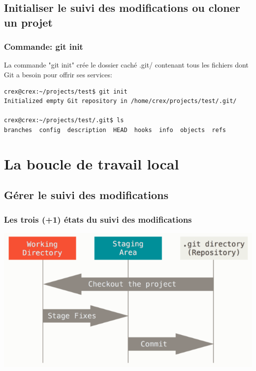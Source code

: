 \documentclass{beamer}
\begin{document}
\subsection{Initialiser le suivi des modifications ou cloner un projet}
\begin{frame}[fragile]
\frametitle{Commande: git init}
La commande "git init" crée le dossier caché .git/ contenant tous les fichiers dont Git a besoin pour offrir ses services:

    \begin{mdframed}[style=Bash]
    \begin{lstlisting}[style=Bash, caption={Contenu du dossier .git/}]
crex@crex:~/projects/test$ git init
Initialized empty Git repository in /home/crex/projects/test/.git/

crex@crex:~/projects/test/.git$ ls
branches  config  description  HEAD  hooks  info  objects  refs
    \end{lstlisting}
    \end{mdframed}
\end{frame}



\section{La boucle de travail local}

\subsection{Gérer le suivi des modifications}
\begin{frame}
\frametitle{Les trois (+1) états du suivi des modifications}

\begin{center}
    \includegraphics[scale=0.4]{images/boucle_locale/threeStates.png}
\end{center}

\end{frame}
\end{document}
